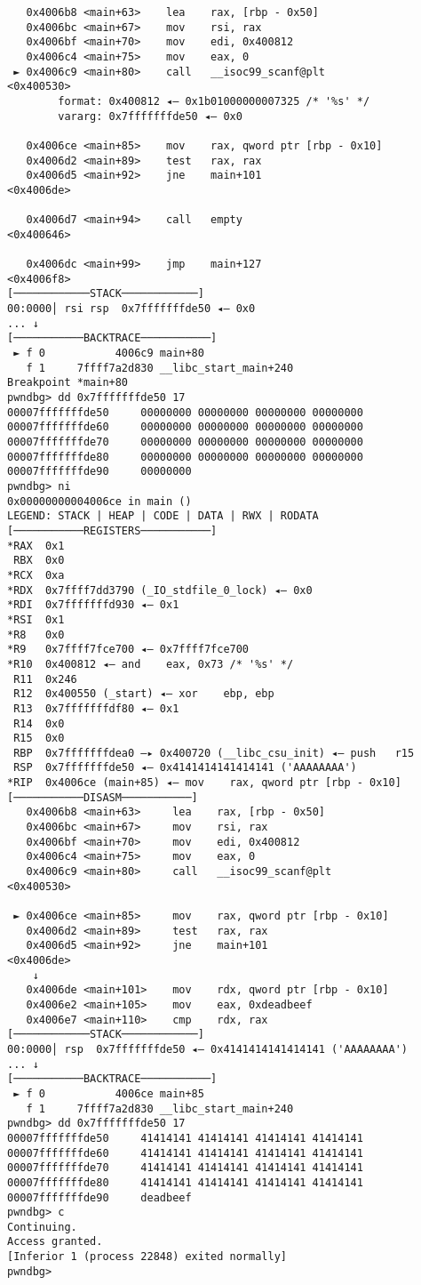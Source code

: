 \documentclass{article}
\begin{document}
\begin{lstlisting}
   0x4006b8 <main+63>    lea    rax, [rbp - 0x50]
   0x4006bc <main+67>    mov    rsi, rax
   0x4006bf <main+70>    mov    edi, 0x400812
   0x4006c4 <main+75>    mov    eax, 0
 ► 0x4006c9 <main+80>    call   __isoc99_scanf@plt            <0x400530>
        format: 0x400812 ◂— 0x1b01000000007325 /* '%s' */
        vararg: 0x7fffffffde50 ◂— 0x0
 
   0x4006ce <main+85>    mov    rax, qword ptr [rbp - 0x10]
   0x4006d2 <main+89>    test   rax, rax
   0x4006d5 <main+92>    jne    main+101                      <0x4006de>
 
   0x4006d7 <main+94>    call   empty                         <0x400646>
 
   0x4006dc <main+99>    jmp    main+127                      <0x4006f8>
[────────────STACK────────────]
00:0000│ rsi rsp  0x7fffffffde50 ◂— 0x0
... ↓
[───────────BACKTRACE───────────]
 ► f 0           4006c9 main+80
   f 1     7ffff7a2d830 __libc_start_main+240
Breakpoint *main+80
pwndbg> dd 0x7fffffffde50 17
00007fffffffde50     00000000 00000000 00000000 00000000
00007fffffffde60     00000000 00000000 00000000 00000000
00007fffffffde70     00000000 00000000 00000000 00000000
00007fffffffde80     00000000 00000000 00000000 00000000
00007fffffffde90     00000000
pwndbg> ni
0x00000000004006ce in main ()
LEGEND: STACK | HEAP | CODE | DATA | RWX | RODATA
[───────────REGISTERS───────────]
*RAX  0x1
 RBX  0x0
*RCX  0xa
*RDX  0x7ffff7dd3790 (_IO_stdfile_0_lock) ◂— 0x0
*RDI  0x7fffffffd930 ◂— 0x1
*RSI  0x1
*R8   0x0
*R9   0x7ffff7fce700 ◂— 0x7ffff7fce700
*R10  0x400812 ◂— and    eax, 0x73 /* '%s' */
 R11  0x246
 R12  0x400550 (_start) ◂— xor    ebp, ebp
 R13  0x7fffffffdf80 ◂— 0x1
 R14  0x0
 R15  0x0
 RBP  0x7fffffffdea0 —▸ 0x400720 (__libc_csu_init) ◂— push   r15
 RSP  0x7fffffffde50 ◂— 0x4141414141414141 ('AAAAAAAA')
*RIP  0x4006ce (main+85) ◂— mov    rax, qword ptr [rbp - 0x10]
[───────────DISASM───────────]
   0x4006b8 <main+63>     lea    rax, [rbp - 0x50]
   0x4006bc <main+67>     mov    rsi, rax
   0x4006bf <main+70>     mov    edi, 0x400812
   0x4006c4 <main+75>     mov    eax, 0
   0x4006c9 <main+80>     call   __isoc99_scanf@plt            <0x400530>
 
 ► 0x4006ce <main+85>     mov    rax, qword ptr [rbp - 0x10]
   0x4006d2 <main+89>     test   rax, rax
   0x4006d5 <main+92>     jne    main+101                      <0x4006de>
    ↓
   0x4006de <main+101>    mov    rdx, qword ptr [rbp - 0x10]
   0x4006e2 <main+105>    mov    eax, 0xdeadbeef
   0x4006e7 <main+110>    cmp    rdx, rax
[────────────STACK────────────]
00:0000│ rsp  0x7fffffffde50 ◂— 0x4141414141414141 ('AAAAAAAA')
... ↓
[───────────BACKTRACE───────────]
 ► f 0           4006ce main+85
   f 1     7ffff7a2d830 __libc_start_main+240
pwndbg> dd 0x7fffffffde50 17
00007fffffffde50     41414141 41414141 41414141 41414141
00007fffffffde60     41414141 41414141 41414141 41414141
00007fffffffde70     41414141 41414141 41414141 41414141
00007fffffffde80     41414141 41414141 41414141 41414141
00007fffffffde90     deadbeef
pwndbg> c
Continuing.
Access granted.
[Inferior 1 (process 22848) exited normally]
pwndbg> 
\end{lstlisting}
\end{document}
